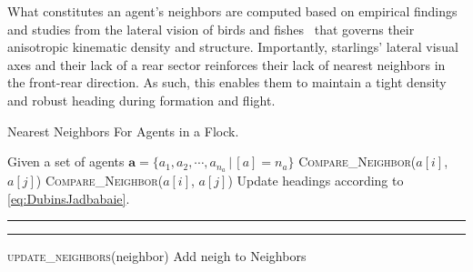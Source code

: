 %
What constitutes an agent's neighbors are computed based on empirical findings and studies from the lateral vision of birds and fishes~\cite{Ballerini1232, JadbabaieCoord, Helbing20} that governs their anisotropic kinematic density and structure. Importantly, starlings' lateral visual axes and their lack of a rear sector reinforces their lack of nearest neighbors in the front-rear direction. As such, this enables them to maintain a tight density and robust heading during formation and flight.
%
\begin{algorithm}[tb!]
	\caption{Nearest Neighbors For Agents in a Flock.
		\label{alg:neighbors}}
	\begin{algorithmic}[1]
		\State Given a set of agents $\bm{a} = \{a_1, a_2, \cdots, a_{n_a} \,| \,[a] = n_a\}$ 
		\label{alg:neighbors:line:lateral_vision_left}
		\State \textsc{Compare\_Neighbor($a[i]$, $a[j]$)}
		\EndFor
		\label{alg:neighbors:line:lateral_vision_right}
		\State \textsc{Compare\_Neighbor($a[i]$, $a[j]$)}
		\EndFor
		\EndFor
		\State Update headings according to \eqref{eq:DubinsJadbabaie}.
		\EndFor 
		\EndFunction
	\end{algorithmic}
	\hrule
	\begin{algorithmic}[1]
		\EndIf
		\EndFunction
	\end{algorithmic}
	\hrule
	\begin{algorithmic}[1]
		\State {}
		\State \textsc{\textsf{update\_neighbors}}(\textup{neighbor})
		\EndFor 
		\EndIf
		\State Add \textup{\textsf{neigh}} to \textsf{Neighbors}
		\EndFunction
		\EndProcedure
	\end{algorithmic}
\end{algorithm}

